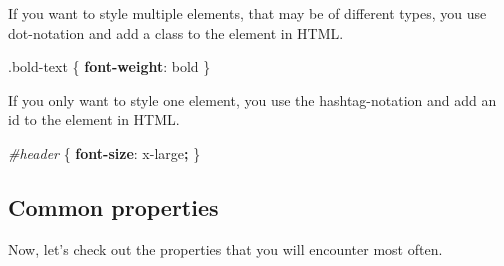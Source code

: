 \documentclass[
]{book}
\newenvironment{Shaded}{\begin{snugshade}}{\end{snugshade}}
\newcommand{\DecValTok}[1]{\textcolor[rgb]{0.00,0.00,0.81}{#1}}
\newcommand{\FunctionTok}[1]{\textcolor[rgb]{0.00,0.00,0.00}{#1}}
\newcommand{\KeywordTok}[1]{\textcolor[rgb]{0.13,0.29,0.53}{\textbf{#1}}}
\newcommand{\NormalTok}[1]{#1}
\newcommand{\OperatorTok}[1]{\textcolor[rgb]{0.81,0.36,0.00}{\textbf{#1}}}
\newcommand{\PreprocessorTok}[1]{\textcolor[rgb]{0.56,0.35,0.01}{\textit{#1}}}
\begin{document}
If you want to style multiple elements, that may be of different types, you use dot-notation and add a class to the element in HTML.

\begin{Shaded}
\begin{Highlighting}[]
\FunctionTok{.bold{-}text}\NormalTok{ \{                           }
  \KeywordTok{font{-}weight}\NormalTok{: }\DecValTok{bold}
\NormalTok{\}}
\end{Highlighting}
\end{Shaded}

If you only want to style one element, you use the hashtag-notation and add an id to the element in HTML.

\begin{Shaded}
\begin{Highlighting}[]
\PreprocessorTok{\#header}\NormalTok{ \{                           }
  \KeywordTok{font{-}size}\NormalTok{: }\DecValTok{x{-}large}\OperatorTok{;}
\NormalTok{\}}
\end{Highlighting}
\end{Shaded}

\hypertarget{common-properties}{%
\subsection*{Common properties}\label{common-properties}}

Now, let's check out the properties that you will encounter most often.
\end{document}
